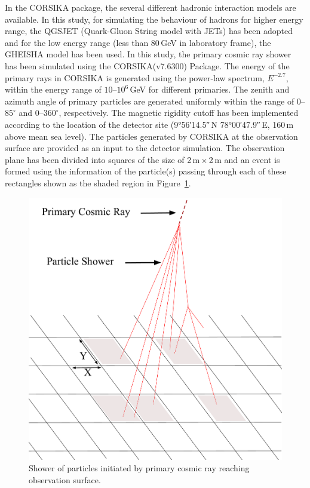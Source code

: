 \documentclass[a4paper,12pt,twoside,openany]{article}
\begin{document}
In the CORSIKA package, the several different hadronic interaction models are available. In this study, for simulating the behaviour of hadrons for higher energy range, the QGSJET (Quark-Gluon String model with JETs)\cite{corsika763} has been adopted and for the low energy range (less than 80\,GeV in laboratory frame), the GHEISHA model has been used. In this study, the primary cosmic ray shower has been simulated using the CORSIKA(v7.6300) Package. The energy of the primary rays in CORSIKA is generated using the power-law spectrum, $E^{-2.7}$, within the energy range of \mbox{$10$--$10^{6}$\,GeV} for different primaries. The zenith and azimuth angle of primary particles are generated uniformly within the range of \mbox{$0$--$85^\circ$} and \mbox{$0$--$360^\circ$}, respectively. The magnetic rigidity cutoff has been implemented according to the location of the detector site (\ang{9;56;14.5}\,N \ang{78;00;47.9}\,E, 160\,m above mean sea level). The particles generated by CORSIKA at the observation surface are provided as an input to the detector simulation. The observation plane has been divided into squares of the size of 2\,m\,$\times$\,2\,m and an event is formed using the information of the particle(s) passing through each of these rectangles shown as the shaded region in Figure~\ref{fig:eas}.
\begin{figure}
  \centering
  \includegraphics[width=0.99\linewidth]{EAS.pdf} 
  \caption{Shower of particles initiated by primary cosmic ray reaching observation surface.}
  \label{fig:eas}
\end{figure}
\end{document}
